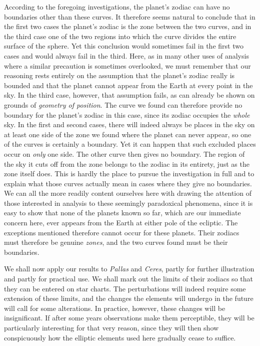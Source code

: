According to the foregoing investigations, the planet’s zodiac can
have no boundaries other than these curves. It therefore seems natural
to conclude that in the first two cases the planet’s zodiac is the
zone between the two curves, and in the third case one of the two
regions into which the curve divides the entire surface of the sphere.
Yet this conclusion would sometimes fail in the first two cases
and would always fail in the third. Here, as in many other uses of
analysis where a similar precaution is sometimes overlooked, we
must remember that our reasoning rests entirely on the assumption that
the planet’s zodiac really is bounded and that the planet cannot
appear from the Earth at every point in the sky. In the third case,
however, that assumption fails, as can already be shown on grounds
of \textit{geometry of position}. The curve we found can therefore
provide no boundary for the planet’s zodiac in this case, since its
zodiac occupies the \textit{whole} sky. In the first and second cases,
there will indeed always be places in the sky on at least one side
of the zone we found where the planet can never appear, so one of the
curves is certainly a boundary. Yet it can happen that such excluded
places occur on \textit{only} one side. The other curve then gives
no boundary. The region of the sky it cuts off from the zone belongs
to the zodiac in its entirety, just as the zone itself does. This
is hardly the place to pursue the investigation in full and to
explain what those curves actually mean in cases where they give
no boundaries. We can all the more readily content ourselves here
with drawing the attention of those interested in analysis to these
seemingly paradoxical phenomena, since it is easy to show that none
of the planets known so far, which are our immediate concern here,
ever appears from the Earth at either pole of the ecliptic. The
exceptions mentioned therefore cannot occur for these planets.
Their zodiacs must therefore be genuine \textit{zones}, and the two
curves found must be their boundaries.

We shall now apply our results to \textit{Pallas} and \textit{Ceres},
partly for further illustration and partly for practical use.
%
We shall mark out the limits of their zodiacs so that they can be
entered on star charts. The perturbations will indeed require some
extension of these limits, and the changes the elements will undergo
in the future will call for some alterations. In practice, however,
these changes will be insignificant. If after some years observations
make them perceptible, they will be particularly interesting for that
very reason, since they will then show conspicuously how the elliptic
elements used here gradually cease to suffice.

